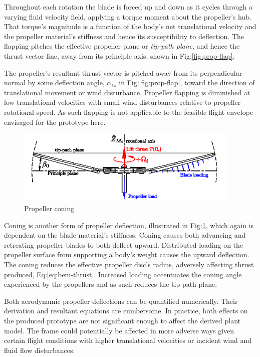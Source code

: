 Throughout each rotation the blade is forced up and down as it cycles through a varying fluid velocity field, applying a torque moment about the propeller's hub. That torque's magnitude is a function of the body's net translational velocity and the propeller material's stiffness and hence its susceptibility to deflection. The flapping pitches the effective propeller plane or \emph{tip-path plane}, and hence the thrust vector line, away from its principle axis; shown in Fig:\ref{fig:prop-flap}.
\par
The propeller's resultant thrust vector is pitched away from its perpendicular normal by some deflection angle, $\alpha_{1s}$ in Fig:\ref{fig:prop-flap}, toward the direction of translational movement or wind disturbance. Propeller flapping is diminished at low translational velocities with small wind disturbances relative to propeller rotational speed. As such flapping is not applicable to the feasible flight envelope envisaged for the prototype here.
\par
\begin{figure}[hbtp]
\centering
\includegraphics[width=0.95\textwidth]{figs/prop-coning}
\caption{Propeller coning}
\label{fig:prop-coning}
\end{figure}
Coning is another form of propeller deflection, illustrated in Fig:\ref{fig:prop-coning}, which again is dependent on the blade material's stiffness. Coning causes both advancing and retreating propeller blades to both deflect upward. Distributed loading on the propeller surface from supporting a body's weight causes the upward deflection. The coning reduces the effective propeller disc's radius, adversely affecting thrust produced, Eq:\ref{eq:bem-thrust}. Increased loading accentuates the coning angle experienced by the propellers and as such reduces the tip-path plane.
\par
Both aerodynamic propeller deflections can be quantified numerically. Their derivation and resultant equations are cumbersome. In practice, both effects on the produced prototype are not significant enough to affect the derived plant model. The frame could potentially be affected in more adverse ways given certain flight conditions with higher translational velocities or incident wind and fluid flow disturbances.
